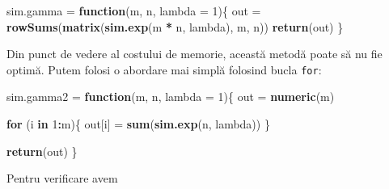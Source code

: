 \documentclass[]{article}
\newenvironment{Shaded}{\begin{snugshade}}{\end{snugshade}}
\newcommand{\ControlFlowTok}[1]{\textcolor[rgb]{0.13,0.29,0.53}{\textbf{#1}}}
\newcommand{\DataTypeTok}[1]{\textcolor[rgb]{0.13,0.29,0.53}{#1}}
\newcommand{\DecValTok}[1]{\textcolor[rgb]{0.00,0.00,0.81}{#1}}
\newcommand{\KeywordTok}[1]{\textcolor[rgb]{0.13,0.29,0.53}{\textbf{#1}}}
\newcommand{\NormalTok}[1]{#1}
\newcommand{\OperatorTok}[1]{\textcolor[rgb]{0.81,0.36,0.00}{\textbf{#1}}}
\newcommand{\StringTok}[1]{\textcolor[rgb]{0.31,0.60,0.02}{#1}}
\begin{document}
\begin{Shaded}
\begin{Highlighting}[]
\NormalTok{sim.gamma =}\StringTok{ }\ControlFlowTok{function}\NormalTok{(m, n, }\DataTypeTok{lambda =} \DecValTok{1}\NormalTok{)\{}
\NormalTok{  out =}\StringTok{ }\KeywordTok{rowSums}\NormalTok{(}\KeywordTok{matrix}\NormalTok{(}\KeywordTok{sim.exp}\NormalTok{(m }\OperatorTok{*}\StringTok{ }\NormalTok{n, lambda), m, n))}
  \KeywordTok{return}\NormalTok{(out)}
\NormalTok{\}}
\end{Highlighting}
\end{Shaded}

Din punct de vedere al costului de memorie, această metodă poate să nu
fie optimă. Putem folosi o abordare mai simplă folosind bucla
\texttt{for}:

\begin{Shaded}
\begin{Highlighting}[]
\NormalTok{sim.gamma2 =}\StringTok{ }\ControlFlowTok{function}\NormalTok{(m, n, }\DataTypeTok{lambda =} \DecValTok{1}\NormalTok{)\{}
\NormalTok{  out =}\StringTok{ }\KeywordTok{numeric}\NormalTok{(m)}
  
  \ControlFlowTok{for}\NormalTok{ (i }\ControlFlowTok{in} \DecValTok{1}\OperatorTok{:}\NormalTok{m)\{}
\NormalTok{    out[i] =}\StringTok{ }\KeywordTok{sum}\NormalTok{(}\KeywordTok{sim.exp}\NormalTok{(n, lambda))}
\NormalTok{  \}}
  
  \KeywordTok{return}\NormalTok{(out)}
\NormalTok{\}}
\end{Highlighting}
\end{Shaded}

Pentru verificare avem
\end{document}

